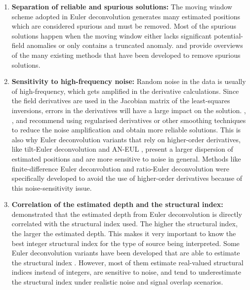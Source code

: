 \begin{enumerate}

\item \textbf{Separation of reliable and spurious solutions:}
The moving window scheme adopted in Euler deconvolution generates many estimated positions which are considered spurious and must be removed.
Most of the spurious solutions happen when the moving window either lacks significant potential-field anomalies or only contains
a truncated anomaly.
\citet{FitzGerald2004} and \citet{Melo2020} provide overviews of the many existing methods that have been developed to remove spurious solutions.

\item \textbf{Sensitivity to high-frequency noise:} Random noise in the data is usually of high-frequency, which gets amplified in the derivative calculations. Since the field derivatives are used in the Jacobian matrix of the least-squares inversions, errors in the derivatives will have a large impact on the solution.
\citet{Pasteka2009}, \citet{Saleh2012}, and \citet{Florio2014} recommend using regularised derivatives or other smoothing techniques to reduce the noise amplification and obtain more reliable solutions.
This is also why Euler deconvolution variants that rely on higher-order derivatives, like tilt-Euler deconvolution \citep{Salem2007,Huang2019} and AN-EUL \citep{Salem2003}, present a larger dispersion of estimated positions and are more sensitive to noise in general.
Methods like finite-difference Euler deconvolution \citep{Gerovska2005} and ratio-Euler deconvolution \citep{Huang2022} were specifically developed to avoid the use of higher-order derivatives because of this noise-sensitivity issue.

\item \textbf{Correlation of the estimated depth and the structural index:}
\citet{Silva2001} demonstrated that the estimated depth from Euler deconvolution is directly correlated with the structural index used.
The higher the structural index, the larger the estimated depth.
This makes it very important to know the best integer structural index for the type of source being interpreted.
Some Euler deconvolution variants have been developed that are able to estimate the structural index \citep[e.g.,][]{Melo2013,Melo2018,Salem2003,Salem2007,Gerovska2005,Silva2003,Florio2013,Florio2014}.
However, most of them estimate real-valued structural indices instead of integers, are sensitive to noise, and tend to underestimate the structural index under realistic noise and signal overlap scenarios.

\end{enumerate}

